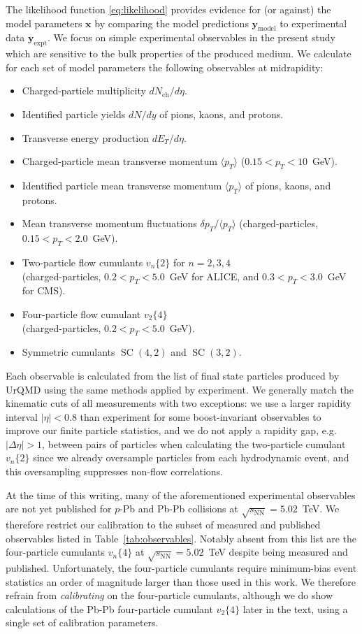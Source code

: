 \documentclass[aps,prc,reprint,amsmath,nofootinbib]{revtex4-1}
\newcommand{\sqrts}{\sqrt{s_\mathrm{NN}}}
\newcommand{\nch}{N_\text{ch}}
\newcommand{\vnk}[2]{v_#1\{#2\}}
\newcommand{\xv}{\mathbf x}
\newcommand{\ym}{{\mathbf y}_\text{model}}
\newcommand{\ye}{{\mathbf y}_\text{expt}}
\DeclareMathOperator{\SC}{SC}
\begin{document}
The likelihood function \eqref{eq:likelihood} provides evidence for (or against) the model parameters $\xv$ by comparing the model predictions $\ym$ to experimental data $\ye$.
We focus on simple experimental observables in the present study which are sensitive to the bulk properties of the produced medium.
We calculate for each set of model parameters the following observables at midrapidity:
\begin{itemize}[leftmargin=1\parindent, itemsep=0pt]
  \item
    Charged-particle multiplicity $d\nch/d\eta$.
  \item
    Identified particle yields $dN/dy$ of pions, kaons, and protons.
  \item
    Transverse energy production $dE_T/d\eta$.
  \item
    Charged-particle mean transverse momentum $\langle p_T \rangle$ ($0.15 < p_T < 10$~GeV).
  \item
    Identified particle mean transverse momentum $\langle p_T \rangle$ of pions, kaons, and protons.
  \item
    Mean transverse momentum fluctuations $\delta p_T / \langle p_T \rangle$ (charged-particles, $0.15 < p_T < 2.0$~GeV).
  \item
    Two-particle flow cumulants $\vnk{n}{2}$ for $n=2,3,4$\\ (charged-particles, $0.2 < p_T < 5.0$~GeV for ALICE, and $0.3 < p_T < 3.0$~GeV for CMS).
  \item
    Four-particle flow cumulant $\vnk{2}{4}$ \\(charged-particles, $0.2 < p_T < 5.0$~GeV).
  \item
    Symmetric cumulants $\SC(4, 2)$ and $\SC(3,2)$.
\end{itemize}

Each observable is calculated from the list of final state particles produced by UrQMD using the same methods applied by experiment.
We generally match the kinematic cuts of all measurements with two exceptions: we use a larger rapidity interval $|\eta| < 0.8$ than experiment for some boost-invariant observables to improve our finite particle statistics, and we do not apply a rapidity gap, e.g.\ $|\Delta \eta| > 1$, between pairs of particles when calculating the two-particle cumulant $\vnk{n}{2}$ since we already oversample particles from each hydrodynamic event, and this oversampling suppresses non-flow correlations.

At the time of this writing, many of the aforementioned experimental observables are not yet published for $p$-Pb and Pb-Pb collisions at $\sqrts=5.02$~TeV.
We therefore restrict our calibration to the subset of measured and published observables listed in Table~\ref{tab:observables}.
Notably absent from this list are the four-particle cumulants $\vnk{n}{4}$ at $\sqrts=5.02$~TeV despite being measured and published.
Unfortunately, the four-particle cumulants require minimum-bias event statistics an order of magnitude larger than those used in this work.
We therefore refrain from \emph{calibrating} on the four-particle cumulants, although we do show calculations of the Pb-Pb four-particle cumulant $\vnk{2}{4}$ later in the text, using a single set of calibration parameters.
\end{document}
